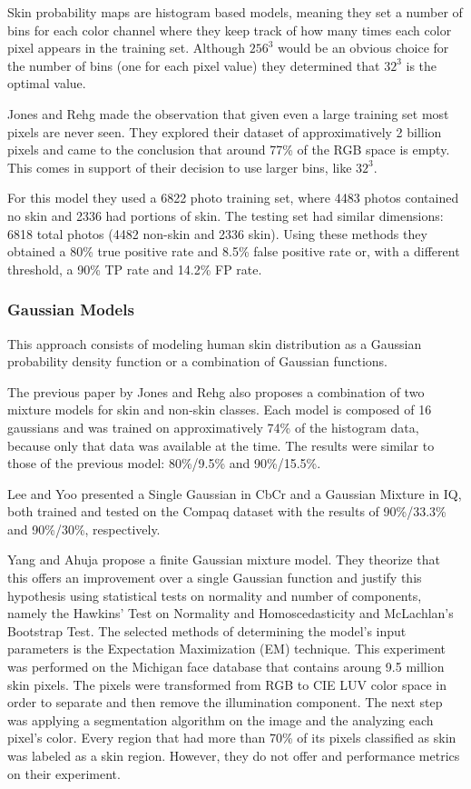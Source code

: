 \documentclass[12pt]{report}
\begin{document}
	Skin probability maps are histogram based models, meaning they set a number of bins for each color channel where they keep track of how many times each color pixel appears in the training set. Although \(256^3\) would be an obvious choice for the number of bins (one for each pixel value) they determined that \(32^3\) is the optimal value.
	
	Jones and Rehg\cite{compaq} made the observation that given even a large training set most pixels are never seen. They explored their dataset of approximatively 2 billion pixels and came to the conclusion that around 77\% of the RGB space is empty. This comes in support of their decision to use larger bins, like \(32^3\).
	
	For this model they used a 6822 photo training set, where 4483 photos contained no skin and 2336 had portions of skin. The testing set had similar dimensions: 6818 total photos (4482 non-skin and 2336 skin). Using these methods they obtained a 80\% true positive rate and 8.5\% false positive rate or, with a different threshold, a 90\% TP rate and 14.2\% FP rate.
	
	\subsubsection{Gaussian Models}
	This approach consists of modeling human skin distribution as a Gaussian probability density function or a combination of Gaussian functions.
	
	The previous paper\cite{compaq} by Jones and Rehg also proposes a combination of two mixture models for skin and non-skin classes. Each model is composed of 16 gaussians and was trained on approximatively 74\% of the histogram data, because only that data was available at the time. The results were similar to those of the previous model: 80\%/9.5\% and 90\%/15.5\%.
	
	Lee and Yoo\cite{gaussian_applied} presented a Single Gaussian in CbCr and a Gaussian Mixture in IQ, both trained and tested on the Compaq dataset with the results of 90\%/33.3\% and 90\%/30\%, respectively.
	
	Yang and Ahuja\cite{Yang99gaussianmixture} propose a finite Gaussian mixture model. They theorize that this offers an improvement over a single Gaussian function and justify this hypothesis using statistical tests on normality and number of components, namely the Hawkins' Test on Normality and Homoscedasticity and McLachlan's Bootstrap Test. The selected methods of determining the model's input parameters is the Expectation Maximization (EM) technique. This experiment was performed on the Michigan face database that contains aroung 9.5 million skin pixels. The pixels were transformed from RGB to CIE LUV color space in order to separate and then remove the illumination component. The next step was applying a segmentation algorithm on the image and the analyzing each pixel's color. Every region that had more than 70\% of its pixels classified as skin was labeled as a skin region. However, they do not offer and performance metrics on their experiment.
	
\end{document}
